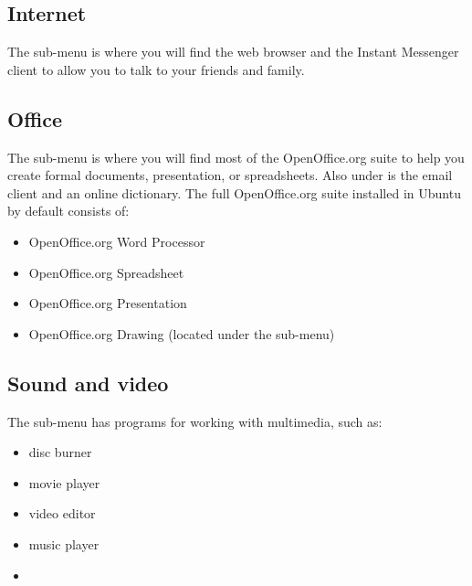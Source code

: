\subsection{Internet}
The  sub-menu is where you will find the  web browser and the  Instant Messenger client to allow you to talk to your friends and family.

\subsection{Office}
The  sub-menu is where you will find most of the OpenOffice.org suite to help you create formal documents, presentation, or spreadsheets. Also under  is the  email client and an online dictionary. The full OpenOffice.org suite installed in Ubuntu by default consists of:

\begin{itemize}
\item OpenOffice.org Word Processor
\item OpenOffice.org Spreadsheet
\item OpenOffice.org Presentation
\item OpenOffice.org Drawing (located under the  sub-menu)
\end{itemize}

\subsection{Sound and video}
The  sub-menu has programs for working with multimedia, such as: 
\begin{itemize}
\item {} disc burner
\item {} movie player
\item {} video editor
\item {} music player
\item {}
\end{itemize}

